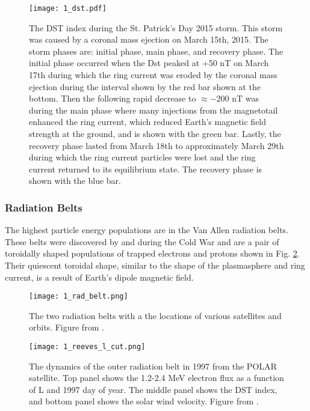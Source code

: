 \begin{figure}
\texttt{[image: 1\_dst.pdf]}
\caption{The DST index during the St. Patrick's Day 2015 storm. This storm was caused by a coronal mass ejection on March 15th, 2015. The storm phases are: initial phase, main phase, and recovery phase. The initial phase occurred when the Dst peaked at +50 nT on March 17th during which the ring current was eroded by the coronal mass ejection during the interval shown by the red bar shown at the bottom. Then the following rapid decrease to $\approx -200$ nT was during the main phase where many injections from the magnetotail enhanced the ring current, which reduced Earth's magnetic field strength at the ground, and is shown with the green bar. Lastly, the recovery phase lasted from March 18th to approximately March 29th during which the ring current particles were lost and the ring current returned to its equilibrium state. The recovery phase is shown with the blue bar.}
\label{Intro:dst}
\end{figure}

\subsubsection{Radiation Belts}\label{Intro:radiation_belt}
The highest particle energy populations are in the Van Allen radiation belts. These belts were discovered by \citet{Allen1959} and \citet{Vernov1960} during the Cold War and are a pair of toroidally shaped populations of trapped electrons and protons shown in Fig. \ref{Intro:rad_belts}. Their quiescent toroidal shape, similar to the shape of the plasmasphere and ring current, is a result of Earth's dipole magnetic field.

\begin{figure}
\texttt{[image: 1\_rad\_belt.png]}
\caption{The two radiation belts with a the locations of various satellites and orbits. Figure from \citep{Horne2013}.}
\label{Intro:rad_belts}
\end{figure}

\begin{figure}
\texttt{[image: 1\_reeves\_l\_cut.png]}
\caption{The dynamics of the outer radiation belt in 1997 from the POLAR satellite. Top panel shows the 1.2-2.4 MeV electron flux as a function of L and 1997 day of year. The middle panel shows the DST index, and bottom panel shows the solar wind velocity. Figure from \citep{Reeves2003}.}
\label{Intro:reeves_l_cut}
\end{figure}

